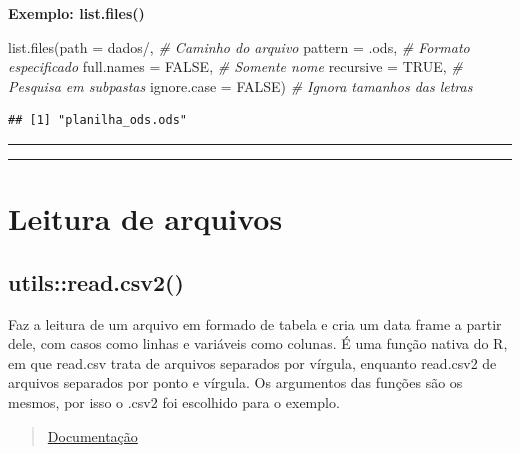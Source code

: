 \documentclass[
]{book}
\newenvironment{Shaded}{\begin{snugshade}}{\end{snugshade}}
\newcommand{\AttributeTok}[1]{\textcolor[rgb]{0.77,0.63,0.00}{#1}}
\newcommand{\CommentTok}[1]{\textcolor[rgb]{0.56,0.35,0.01}{\textit{#1}}}
\newcommand{\ConstantTok}[1]{\textcolor[rgb]{0.00,0.00,0.00}{#1}}
\newcommand{\FunctionTok}[1]{\textcolor[rgb]{0.00,0.00,0.00}{#1}}
\newcommand{\NormalTok}[1]{#1}
\newcommand{\StringTok}[1]{\textcolor[rgb]{0.31,0.60,0.02}{#1}}
\theoremstyle{definition}
\theoremstyle{definition}
\theoremstyle{definition}
\theoremstyle{definition}
\theoremstyle{remark}
\begin{document}
\textbf{Exemplo: list.files()}

\begin{Shaded}
\begin{Highlighting}[]
\FunctionTok{list.files}\NormalTok{(}\AttributeTok{path =} \StringTok{\textquotesingle{}dados/\textquotesingle{}}\NormalTok{,      }\CommentTok{\# Caminho do arquivo}
           \AttributeTok{pattern =} \StringTok{\textquotesingle{}.ods\textquotesingle{}}\NormalTok{,     }\CommentTok{\# Formato especificado}
           \AttributeTok{full.names =} \ConstantTok{FALSE}\NormalTok{,   }\CommentTok{\# Somente nome}
           \AttributeTok{recursive =} \ConstantTok{TRUE}\NormalTok{,     }\CommentTok{\# Pesquisa em subpastas}
           \AttributeTok{ignore.case =} \ConstantTok{FALSE}\NormalTok{)  }\CommentTok{\# Ignora tamanhos das letras}
\end{Highlighting}
\end{Shaded}

\begin{verbatim}
## [1] "planilha_ods.ods"
\end{verbatim}

\begin{center}\rule{0.5\linewidth}{0.5pt}\end{center}

\begin{center}\rule{0.5\linewidth}{0.5pt}\end{center}

\hypertarget{leitura-de-arquivos}{%
\section{Leitura de arquivos}\label{leitura-de-arquivos}}

\hypertarget{utilsread.csv2}{%
\subsection{utils::read.csv2()}\label{utilsread.csv2}}

Faz a leitura de um arquivo em formado de tabela e cria um data frame a partir dele, com casos como linhas e variáveis como colunas. É uma função nativa do R, em que read.csv trata de arquivos separados por vírgula, enquanto read.csv2 de arquivos separados por ponto e vírgula. Os argumentos das funções são os mesmos, por isso o .csv2 foi escolhido para o exemplo.

\begin{quote}
\href{https://www.rdocumentation.org/packages/utils/versions/3.6.2/topics/read.table}{Documentação}
\end{quote}
\end{document}
